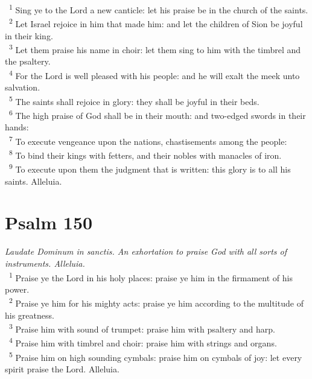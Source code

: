 \documentclass[a5paper,12pt]{article}
\begin{document}
\begin{multicols*}{2}
~\textsuperscript{1} Sing ye to the Lord a new canticle: let his praise be in the church of the saints.\\
~\textsuperscript{2} Let Israel rejoice in him that made him: and let the children of Sion be joyful in their king.\\
~\textsuperscript{3} Let them praise his name in choir: let them sing to him with the timbrel and the psaltery.\\
~\textsuperscript{4} For the Lord is well pleased with his people: and he will exalt the meek unto salvation.\\
~\textsuperscript{5} The saints shall rejoice in glory: they shall be joyful in their beds.\\
~\textsuperscript{6} The high praise of God shall be in their mouth: and two-edged swords in their hands:\\
~\textsuperscript{7} To execute vengeance upon the nations, chastisements among the people:\\
~\textsuperscript{8} To bind their kings with fetters, and their nobles with manacles of iron.\\
~\textsuperscript{9} To execute upon them the judgment that is written: this glory is to all his saints. Alleluia.\\

\section{Psalm 150}
\label{sec:org1355274}
\emph{Laudate Dominum in sanctis. An exhortation to praise God with all sorts of instruments. Alleluia.}\\

~\textsuperscript{1} Praise ye the Lord in his holy places: praise ye him in the firmament of his power.\\
~\textsuperscript{2} Praise ye him for his mighty acts: praise ye him according to the multitude of his greatness.\\
~\textsuperscript{3} Praise him with sound of trumpet: praise him with psaltery and harp.\\
~\textsuperscript{4} Praise him with timbrel and choir: praise him with strings and organs.\\
~\textsuperscript{5} Praise him on high sounding cymbals: praise him on cymbals of joy: let every spirit praise the Lord. Alleluia.\\

\end{multicols*}
\end{document}
